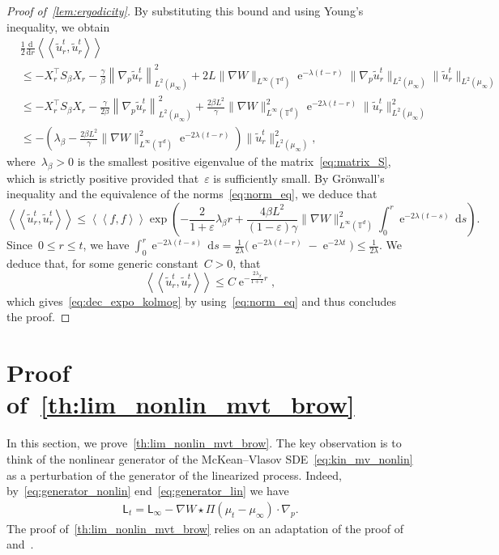 \documentclass[onefignum,onetabnum]{siamart251216} %
\DeclareMathOperator{\e}{e}
\renewcommand{\d}{\mathrm{d}}
\newcommand{\norm}[1]{\left\lVert#1\right\rVert}
\newcommand{\torus}{\mathbb T}
\renewcommand{\leq}{\leqslant}
\newcommand{\mescin}{\mu}
\newcommand{\projp}{\Pi}
\newcommand{\gennonlin}[1]{\mathsf{L}_{#1}}
\newcommand{\genlin}{\mathsf{L}_\infty}
\newcommand{\dblangle}[1]{\left\langle\!\left\langle #1 \right\rangle\!\right\rangle}
\newcommand{\norml}[1]{\norm{#1}_{L^2(\mescin_\infty)}}
\newcommand{\eps}{\varepsilon}
\theoremstyle{plain}
\numberwithin{equation}{section}
\numberwithin{theorem}{section}
\begin{document}
\begin{proof}[Proof of~\cref{lem:ergodicity}]
By substituting this bound and using Young's inequality, we obtain
\begin{align*}
    &\frac{1}{2} \frac{\d}{\d r} \dblangle{\widetilde u_r^t, \widetilde u_r^t}\\
    &\leq
    -X_r^\top S_\beta X_r -\frac{\gamma}{\beta}\!\norml{\nabla_p \widetilde u_r^t}^2
    \!+ \!2L \lVert \nabla W \rVert_{L^{\infty}(\torus^d)} \!\e^{- \lambda (t - r)} \!\|\nabla_p \widetilde u_r^t\|_{L^2(\mu_{\infty})} \|\widetilde u_r^t\|_{L^2(\mu_{\infty})} \, \\
    &\leq
    -X_r^\top S_\beta X_r -\frac{\gamma}{2\beta}\norml{\nabla_p \widetilde u_r^t}^2
    + \frac{2\beta L^2}{\gamma} \lVert \nabla W \rVert_{L^{\infty}(\torus^d)}^2 \e^{- 2\lambda (t - r)} \|\widetilde u_r^t\|^2_{L^2(\mu_{\infty})} \, \\
    &\leq
    - \left( \lambda_\beta - \frac{ 2\beta L^2}{\gamma} \lVert \nabla W \rVert_{L^{\infty}(\torus^d)}^2
    \e^{- 2\lambda (t - r)} \right)\|\widetilde u_r^t\|^2_{L^2(\mu_{\infty})},
\end{align*}
where~$\lambda_\beta>0$ is the smallest positive eigenvalue of the matrix~\eqref{eq:matrix_S},
which is strictly positive provided that~$\eps$ is sufficiently small.
By Gr\"onwall's inequality and the equivalence of the norms~\eqref{eq:norm_eq}, we deduce that
\[
    \dblangle{\widetilde u_r^t, \widetilde u_r^t}
    \leq \dblangle{f, f}
    \exp\left( - \frac{2}{1+\eps} \lambda_\beta r
    + \frac{4\beta L^2}{(1 - \varepsilon) \gamma} \lVert \nabla W \rVert_{L^{\infty}(\torus^d)}^2
    \int_{0}^{r} \e^{- 2\lambda (t - s)} \, \d s \right).
\]
Since~$0\leq r \leq t$, we have $ \int_{0}^{r} \e^{- 2\lambda (t - s)} \, \d s = \frac{1}{2\lambda} \bigl(\e^{- 2\lambda (t - r)} - \e^{-2\lambda t}\bigr) \leq \frac{1}{2\lambda}.$ We deduce that, for some generic constant~$C > 0$, that
\[
    \dblangle{\widetilde u_r^t, \widetilde u_r^t} \leq C \e^{- \frac{2\lambda_\beta}{1+\eps} r},
\]
which gives~\eqref{eq:dec_expo_kolmog} by using~\eqref{eq:norm_eq} and thus concludes the proof.
\end{proof}
%
%
\section{Proof of~\texorpdfstring{\cref{th:lim_nonlin_mvt_brow}}{Theorem~\ref{th:lim_nonlin_mvt_brow}}}
\label{sec:diffusive_MF}
In this section, we prove~\cref{th:lim_nonlin_mvt_brow}.
The key observation is to think of the nonlinear generator of the McKean--Vlasov SDE~\eqref{eq:kin_mv_nonlin} as a perturbation of the generator of the linearized process.
Indeed, by~\eqref{eq:generator_nonlin} end~\eqref{eq:generator_lin} we have
\begin{align}
    \label{eq:gen_non_comp_lin}
    \gennonlin{t}
    = \genlin- \nabla W \star  \projp(\mescin_t -\mescin_\infty)\cdot \nabla_p.
\end{align}
The proof of~\cref{th:lim_nonlin_mvt_brow} relies on an adaptation of the proof of~\cite[Theorem 1.5]{olla1994homogenization} and~\cite[Theorem 1]{fathi2015error}.
\end{document}
